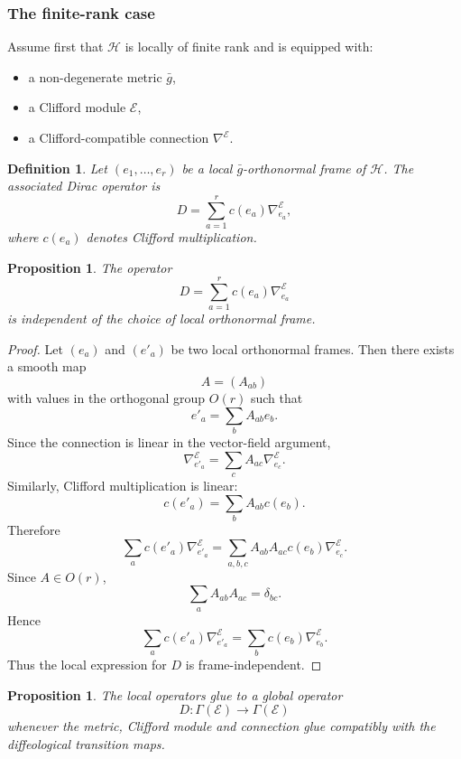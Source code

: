 \documentclass[11pt]{amsart}
\newtheorem{proposition}[theorem]{Proposition}
\newtheorem{definition}[theorem]{Definition}
\begin{document}
\subsubsection{The finite-rank case}

Assume first that \(\mathcal H\) is locally of finite rank and is equipped with:
\begin{itemize}
\item a non-degenerate metric \(\bar g\),
\item a Clifford module \(\mathcal E\),
\item a Clifford-compatible connection \(\nabla^{\mathcal E}\).
\end{itemize}

\begin{definition}
Let \((e_1,\ldots,e_r)\) be a local \(\bar g\)-orthonormal frame of
\(\mathcal H\). The associated Dirac operator is
\[
D
=
\sum_{a=1}^r c(e_a)\nabla^{\mathcal E}_{e_a},
\]
where \(c(e_a)\) denotes Clifford multiplication.
\end{definition}

\begin{proposition}
The operator
\[
D=\sum_{a=1}^r c(e_a)\nabla^{\mathcal E}_{e_a}
\]
is independent of the choice of local orthonormal frame.
\end{proposition}

\begin{proof}
Let \((e_a)\) and \((e'_a)\) be two local orthonormal frames. Then there exists
a smooth map
\[
A=(A_{ab})
\]
with values in the orthogonal group \(O(r)\) such that
\[
e'_a=\sum_b A_{ab}e_b.
\]
Since the connection is linear in the vector-field argument,
\[
\nabla^{\mathcal E}_{e'_a}
=
\sum_c A_{ac}\nabla^{\mathcal E}_{e_c}.
\]
Similarly, Clifford multiplication is linear:
\[
c(e'_a)
=
\sum_b A_{ab}c(e_b).
\]
Therefore
\[
\sum_a c(e'_a)\nabla^{\mathcal E}_{e'_a}
=
\sum_{a,b,c}A_{ab}A_{ac}c(e_b)\nabla^{\mathcal E}_{e_c}.
\]
Since \(A\in O(r)\),
\[
\sum_a A_{ab}A_{ac}=\delta_{bc}.
\]
Hence
\[
\sum_a c(e'_a)\nabla^{\mathcal E}_{e'_a}
=
\sum_b c(e_b)\nabla^{\mathcal E}_{e_b}.
\]
Thus the local expression for \(D\) is frame-independent.
\end{proof}

\begin{proposition}
The local operators glue to a global operator
\[
D:\Gamma(\mathcal E)\longrightarrow \Gamma(\mathcal E)
\]
whenever the metric, Clifford module and connection glue compatibly with the
diffeological transition maps.
\end{proposition}
\end{document}
